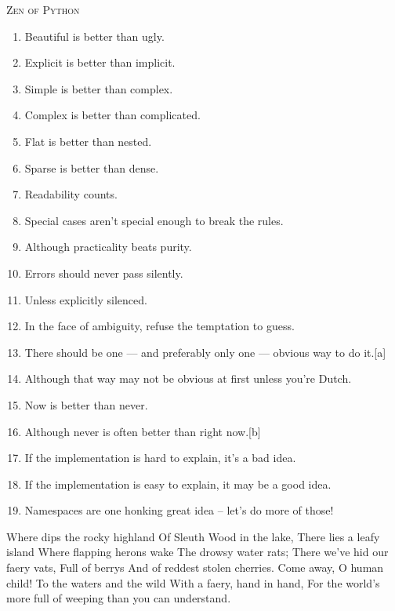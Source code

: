 \documentclass[12pt]{empposter}
\newcommand\heading[1]{\textsc{\LARGE {#1}} \\[0.5em]}
\begin{document}
\begin{paracol}{2}
\begin{borderedbox}[marginright=0.25in]
    \heading{Zen of Python}
    \begin{enumerate}
        \item Beautiful is better than ugly.
        \item Explicit is better than implicit.
        \item Simple is better than complex.
        \item Complex is better than complicated.
        \item Flat is better than nested.
        \item Sparse is better than dense.
        \item Readability counts.
        \item Special cases aren't special enough to break the rules.
        \item Although practicality beats purity.
        \item Errors should never pass silently.
        \item Unless explicitly silenced.
        \item In the face of ambiguity, refuse the temptation to guess.
        \item There should be one --- and preferably only one --- obvious way to do it.[a]
        \item Although that way may not be obvious at first unless you're Dutch.
        \item Now is better than never.
        \item Although never is often better than right now.[b]
        \item If the implementation is hard to explain, it's a bad idea.
        \item If the implementation is easy to explain, it may be a good idea.
        \item Namespaces are one honking great idea – let's do more of those!
    \end{enumerate}
\end{borderedbox}
\switchcolumn
\begin{verbbox}[\normalfont]
Where dips the rocky highland
Of Sleuth Wood in the lake,
There lies a leafy island
Where flapping herons wake
The drowsy water rats;
There we've hid our faery vats,
Full of berrys
And of reddest stolen cherries.
Come away, O human child!
To the waters and the wild
With a faery, hand in hand,
For the world's more full of weeping than you can understand.


\end{verbbox}
\end{paracol}
\end{document}
